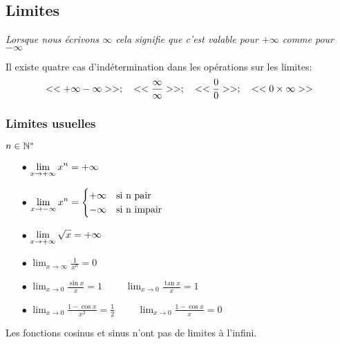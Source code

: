 
\everymath{\displaystyle}



\subsection{Limites}


\textsl{Lorsque nous écrivons $ \infty $ cela signifie que c'est valable pour $ +\infty$ comme pour $-\infty $ }

 Il existe quatre cas d'indétermination dans les opérations sur les limites:
\[ <<+\infty -\infty>>;\quad <<\frac{\infty}{\infty}>>;\quad << \frac{0}{0}>>;\quad <<0\times \infty >> \]
\subsubsection*{Limites usuelles}
 $ n\in\mathbb{N}^* $
\begin{itemize}
\item[$ \bullet $] $ \displaystyle\lim_{x \to +\infty}x^{n}= +\infty$ 
\item[$ \bullet $] $\displaystyle\lim_{x \to -\infty}x^{n}= \begin{cases}
+\infty & \text{si n pair} \\
-\infty & \text{si  n impair}
\end{cases}$ 
\item[$ \bullet $] $\displaystyle \lim_{x \to +\infty}\sqrt{x}=+\infty$ 
\item[$ \bullet $] $\displaystyle \lim_{x \to \infty} \frac{1}{x^{n}}=0$ 
\item[$ \bullet $] $\displaystyle \lim_{x \to 0}\frac{\sin x}{x}=1$  $\qquad \displaystyle \lim_{x \to 0}\frac{\tan x}{x}=1$ 
\item[$ \bullet $] $ \displaystyle\lim_{x \to 0}\frac{1-\cos x}{x^{2}}= \frac{1}{2}$ $\qquad  \displaystyle\lim_{x \to 0}\frac{1-\cos x}{x}= 0$ 

\end{itemize}
\begin{remark}
Les fonctions cosinus et sinus n'ont pas de limites à l'infini.
\end{remark}
